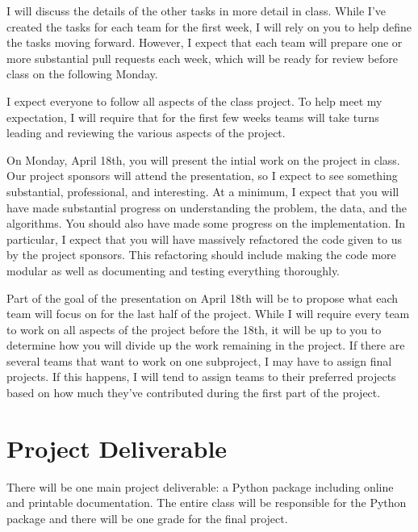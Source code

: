 \documentclass[11pt, oneside]{article}   	%
\begin{document}
I will discuss the details of the other tasks in more detail in class.  While
I've created the tasks for each team for the first week, I will rely on you
to help define the tasks moving forward.  However, I expect that each team
will prepare one or more substantial pull requests each week, which will be
ready for review before class on the following Monday.

I expect everyone to follow all aspects of the class project.  To help
meet my expectation, I will require that for the first few weeks teams
will take turns leading and reviewing the various aspects of the project.

On Monday, April 18th, you will present the intial work on the project in
class.  Our project sponsors will attend the presentation, so I expect to see
something substantial, professional, and interesting.  At a minimum, I expect
that you will have made substantial progress on understanding the problem, the
data, and the algorithms.  You should also have made some progress on the
implementation.  In particular, I expect that you will have massively
refactored the code given to us by the project sponsors.  This refactoring
should include making the code more modular as well as documenting and
testing everything thoroughly.

Part of the goal of the presentation on April 18th will be to propose what each
team will focus on for the last half of the project.  While I will require
every team to work on all aspects of the project before the 18th, it will be up
to you to determine how you will divide up the work remaining in the project.
If there are several teams that want to work on one subproject, I may have to
assign final projects.  If this happens, I will tend to assign teams to their
preferred projects based on how much they've contributed during the first part
of the project.


\section{Project Deliverable}

There will be one main project deliverable: a Python package including online
and printable documentation.  The entire class will be responsible for the
Python package and there will be one grade for the final project.
\end{document}
